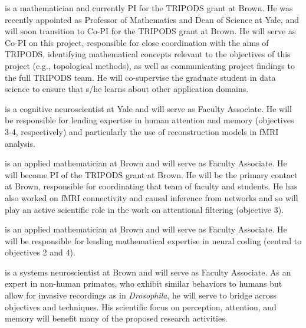  is a mathematician and currently PI for the
TRIPODS grant at Brown. He was recently appointed as Professor of Mathematics and Dean
of Science at Yale, and will soon transition to Co-PI for the TRIPODS
grant at Brown. He will serve as Co-PI on this project, responsible for
close coordination with the aims of TRIPODS, identifying mathematical
concepts relevant to the objectives of this project (e.g., topological
methods), as well as communicating project findings to the full
TRIPODS team. He will co-supervise the graduate student in data
science to ensure that s/he learns about other application domains.

 is a cognitive neuroscientist at Yale and will serve as
Faculty Associate. He will be responsible for lending expertise in
human attention and memory (objectives 3-4, respectively) and
particularly the use of reconstruction models in fMRI analysis.

 is an applied mathematician at Brown and will serve as
Faculty Associate. He will become PI of the TRIPODS grant at Brown. He will
be the primary contact at Brown, responsible for coordinating that
team of faculty and students. He has also worked on fMRI connectivity
and causal inference from networks and so will play an active
scientific role in the work on attentional filtering (objective 3).

 is an applied mathematician at Brown and will serve as
Faculty Associate. He will be responsible for lending mathematical
expertise in neural coding (central to objectives 2 and 4).

 is a systems neuroscientist at Brown and will serve as
Faculty Associate. As an expert in non-human primates, who exhibit
similar behaviors to humans but allow for invasive recordings as in
{\it Drosophila}, he will serve to bridge across objectives and
techniques. His scientific focus on perception, attention, and memory
will benefit many of the proposed research activities.

